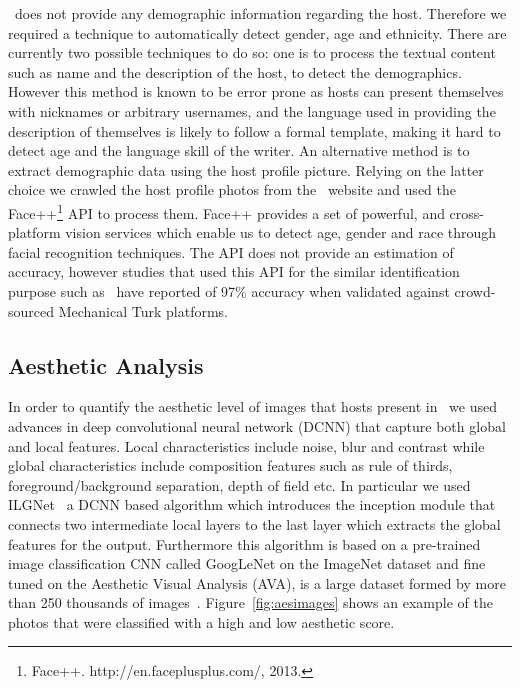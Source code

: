 \ab \ does not provide any demographic information regarding the host. Therefore we required a technique to automatically detect gender, age and ethnicity. There are currently two possible techniques to do so: one is to process the textual content such as name and the description of the host, to detect the demographics. However this method is known to be error prone as hosts can present themselves with nicknames or arbitrary usernames, and the language used in providing the description of themselves is likely to follow a formal template, making it hard to detect age and the language skill of the writer. An alternative method is to extract demographic data using the host profile picture.  Relying on the latter choice we crawled the host profile photos from the \ab \ website and used the Face++\footnote{Face++. http://en.faceplusplus.com/, 2013.} API to process them. Face++ provides a set of  powerful, and cross-platform vision services which enable us to detect age, gender and race through facial recognition techniques. The API does not provide an estimation of accuracy, however studies that used this API for the similar identification purpose such as~\cite{bakhshi2014faces} have reported of 97\% accuracy when validated against crowd-sourced Mechanical Turk platforms.

\subsection{Aesthetic Analysis}
In order to quantify the aesthetic level of images that hosts present in \ab \ we used advances in deep convolutional neural
network (DCNN) that capture both global and local features.  Local characteristics include noise, blur and contrast while global characteristics include composition features such as rule of thirds, foreground/background separation, depth of field etc. 
In particular we used ILGNet~\cite{ilgnet} a DCNN based algorithm which  introduces the inception module that connects two intermediate local layers to the last layer which extracts the global features for the output. Furthermore this algorithm is based on a pre-trained image classification CNN called GoogLeNet on the ImageNet dataset and  fine tuned on the Aesthetic Visual Analysis (AVA), is a large dataset formed by more than 250 thousands of images~\cite{murray2012ava}. Figure~\ref{fig:aesimages} shows an example of the photos that were classified with a high and low aesthetic score.

